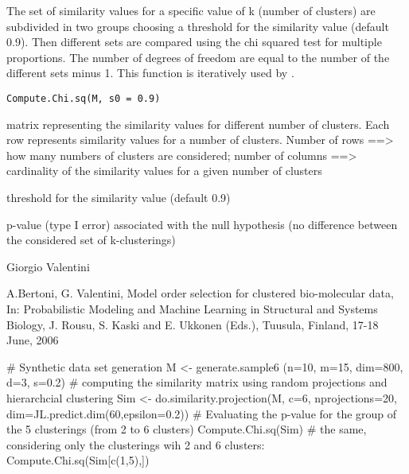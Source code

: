 \documentclass{article}
\begin{document}
\begin{Description}\relax
The set of similarity values for a specific value of k (number of clusters) are subdivided in two groups
choosing a threshold for the similarity value (default 0.9). Then different sets are compared using the chi squared test for multiple proportions.
The number of degrees of freedom are equal to the number of the different sets minus 1.
This function is iteratively used by .
\end{Description}
\begin{Usage}
\begin{verbatim}
Compute.Chi.sq(M, s0 = 0.9)
\end{verbatim}
\end{Usage}
\begin{Arguments}
\begin{ldescription}
\item[\code{M}] matrix representing the similarity values for different number of clusters. Each row represents similarity values for a
number of clusters. Number of rows ==> how many numbers of clusters are considered; 
number of columns ==> cardinality of the similarity values for a given number of clusters 
\item[\code{s0}] threshold for the similarity value (default 0.9) 
\end{ldescription}
\end{Arguments}
\begin{Value}
p-value (type I error) associated with the null hypothesis (no difference between the considered set of k-clusterings)
\end{Value}
\begin{Author}\relax
Giorgio Valentini 
\end{Author}
\begin{References}\relax
A.Bertoni, G. Valentini, Model order selection for clustered bio-molecular data,  
In: Probabilistic Modeling and Machine Learning in Structural and Systems Biology, J. Rousu, S. Kaski and E. Ukkonen (Eds.), 
Tuusula, Finland, 17-18 June,  2006
\end{References}
\begin{SeeAlso}\relax
{}
\end{SeeAlso}
\begin{Examples}
\begin{ExampleCode}
# Synthetic data set generation
M <- generate.sample6 (n=10, m=15, dim=800, d=3, s=0.2)
# computing the similarity matrix using random projections and hierarchcial clustering
Sim <- do.similarity.projection(M, c=6, nprojections=20, dim=JL.predict.dim(60,epsilon=0.2))
# Evaluating the p-value for the group of the 5 clusterings (from 2 to 6 clusters)
Compute.Chi.sq(Sim)
# the same, considering only the clusterings wih 2 and 6 clusters:
Compute.Chi.sq(Sim[c(1,5),])
\end{ExampleCode}
\end{Examples}
\end{document}
